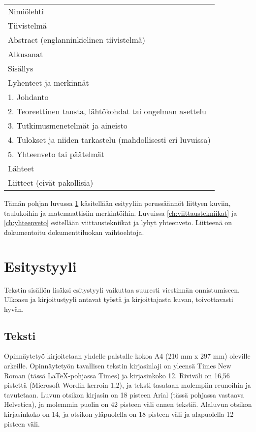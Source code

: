 \documentclass[globalnumbering,centeredcaptions,draftfooter]{tutthesis/tutthesis} %
\begin{document}
\begin{tabular}[h]{l}
Nimiölehti\\
Tiivistelmä\\
Abstract (englanninkielinen tiivistelmä)\\
Alkusanat\\
Sisällys\\
Lyhenteet ja merkinnät\\
1. Johdanto\\
2. Teoreettinen tausta, lähtökohdat tai ongelman asettelu \\
3. Tutkimusmenetelmät ja aineisto \\
4. Tulokset ja niiden tarkastelu (mahdollisesti eri luvuissa)\\
5. Yhteenveto tai päätelmät\\
Lähteet\\
Liitteet (eivät pakollisia)\\
\end{tabular}

Tämän pohjan luvussa \ref{ch:esitystyyli} käsitellään esityyliin perussäännöt liittyen kuviin, taulukoihin ja matemaattisiin merkintöihin.
Luvuissa \ref{ch:viittaustekniikat} ja \ref{ch:yhteenveto} esitellään viittaustekniikat ja lyhyt yhteenveto.
Liitteenä on dokumentoitu dokumenttiluokan vaihtoehtoja.



\chapter{Esitystyyli}
\label{ch:esitystyyli}

Tekstin sisällön lisäksi esitystyyli vaikuttaa suuresti viestinnän onnistumiseen.
Ulkoasu ja kirjoitustyyli antavat työstä ja kirjoittajasta kuvan, toivottavasti hyvän.

\section{Teksti}

Opinnäytetyö kirjoitetaan yhdelle palstalle kokoa A4 (210 mm x 297 mm) oleville arkeille.
Opinnäytetyön tavallisen tekstin kirjasinlaji on yleensä Times New Roman (tässä LaTeX-pohjassa Times) ja kirjasinkoko 12.
Riviväli on 16,56 pistettä (Microsoft Wordin kerroin 1,2), ja teksti tasataan molempiin reunoihin ja tavutetaan.
Luvun otsikon kirjasin on 18 pisteen Arial (tässä pohjassa vastaava Helvetica), ja molemmin puolin on 42 pisteen väli ennen tekstiä.
Alaluvun otsikon kirjasinkoko on 14, ja otsikon yläpuolella on 18 pisteen väli ja alapuolella 12 pisteen väli.
\end{document}
